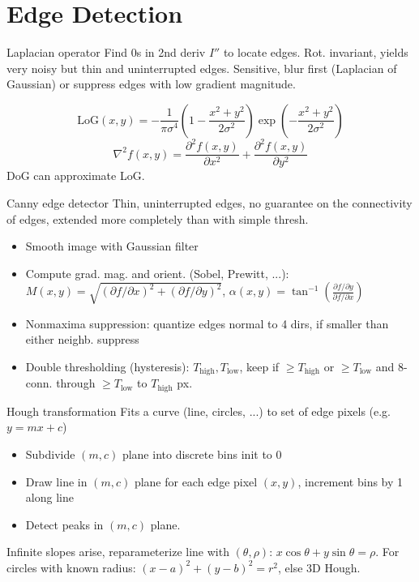 \documentclass[a4paper,9pt]{article}
\begin{document}
\section{Edge Detection}
\begin{subbox}{Laplacian operator}
Find 0s in 2nd deriv $I''$ to locate edges. Rot. invariant, yields very noisy but thin and uninterrupted edges. Sensitive, blur first (Laplacian of Gaussian) or suppress edges with low gradient magnitude.
\end{subbox}
$$\text{LoG}(x, y) = - \frac{1}{\pi \sigma^4} \left(1 - \frac{x^2 + y^2}{2 \sigma^2}\right) \exp\left(-\frac{x^2 + y^2}{2 \sigma^2}\right)$$
$$\nabla^2 f(x, y) = \frac{\partial^2 f(x, y)}{\partial x^2} + \frac{\partial^2 f(x, y)}{\partial y^2}$$
DoG can approximate LoG.
\begin{subbox}{Canny edge detector}
Thin, uninterrupted edges, no guarantee on the connectivity of edges, extended more completely than with simple thresh.
\begin{itemize}
  \item Smooth image with Gaussian filter
  \item Compute grad. mag. and orient. (Sobel, Prewitt, ...): $M(x, y) = \sqrt{(\partial f/\partial x)^2 + (\partial f/\partial y)^2}$, $\alpha(x, y) = \tan^{-1}\left(\frac{\partial f/\partial y}{\partial f/\partial x}\right)$
  \item Nonmaxima suppression: quantize edges normal to 4 dirs, if smaller than either neighb. suppress
  \item Double thresholding (hysteresis): $T_{\text{high}}, T_{\text{low}}$, keep if $\ge T_{\text{high}}$ or $\ge T_{\text{low}}$ and 8-conn. through $\ge T_{\text{low}}$ to $T_{\text{high}}$ px.
\end{itemize}
\end{subbox}
\begin{subbox}{Hough transformation}
Fits a curve (line, circles, ...) to set of edge pixels (e.g. $y = m x + c$)
\begin{itemize}
  \item Subdivide $(m, c)$ plane into discrete bins init to 0
  \item Draw line in $(m, c)$ plane for each edge pixel $(x, y)$, increment bins by 1 along line
  \item Detect peaks in $(m, c)$ plane.
\end{itemize}
Infinite slopes arise, reparameterize line with $(\theta, \rho)$: $x \cos \theta + y \sin \theta = \rho$. For circles with known radius: $(x - a)^2 + (y - b)^2 = r^2$, else 3D Hough.
\end{subbox}
\end{document}
